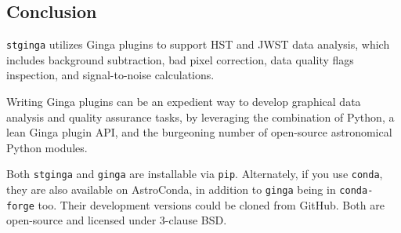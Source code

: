\documentclass[]{article}
\begin{document}
\begin{multicols}{3}
\section*{Conclusion}

{\tt stginga} utilizes Ginga plugins to support HST and JWST data analysis,
which includes background subtraction, bad pixel correction, data quality flags
inspection, and signal-to-noise calculations.

\para
Writing Ginga plugins can be an expedient way to develop graphical data
analysis and quality assurance tasks, by leveraging the combination of
Python, a lean Ginga plugin API, and the burgeoning number of open-source
astronomical Python modules.

\para
Both {\tt stginga} and {\tt ginga} are installable via {\tt pip}. Alternately,
if you use {\tt conda}, they are also available on AstroConda\cite{astroconda},
in addition to {\tt ginga} being in  {\tt conda-forge} too. Their development
versions could be cloned from GitHub. Both are open-source and licensed under
3-clause BSD.




\end{multicols}
\end{document}
